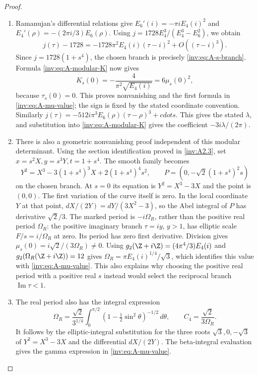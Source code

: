 \begin{proof}
\begin{enumerate}[label={$\langle1\rangle$\arabic*.},leftmargin=*]
\item Ramanujan's differential relations give
$E_6'(i)=-\pi i E_4(i)^2$ and
$E_4'(\rho)=-(2\pi i/3)E_6(\rho)$.
Using $j=1728E_4^3/(E_4^3-E_6^2)$, we obtain
\[
j(\tau)-1728=-1728\pi^2E_4(i)(\tau-i)^2+O((\tau-i)^3).
\]
Since $j=1728(1+s^4)$, the chosen branch is precisely
\eqref{inv:eq:A-s-branch}.  Formula \eqref{inv:eq:A-modular-K} now gives
\[
K_s(0)=-\frac4{\pi^2\sqrt{E_4(i)}}=6\mu_s(0)^2,
\]
because $\tau_s(0)=0$.  This proves nonvanishing and the first
formula in \eqref{inv:eq:A-mu-value}; the sign is fixed by the stated
coordinate convention.  Similarly
$j(\tau)=-512i\pi^3E_6(\rho)(\tau-\rho)^3+cdots$.
This gives the stated $\lambda$, and substitution into
\eqref{inv:eq:A-modular-K} gives the coefficient $-3i\lambda/(2\pi)$.

\item There is also a geometric nonvanishing proof independent of this
modular determinant.  Using the section identification proved in
\ref{inv:A2.3}, set $x=s^2X,y=s^3Y,t=1+s^4$.  The smooth family becomes
\[
Y^2=X^3-3(1+s^4)^3X+2(1+s^4)^4s^2,
\qquad P=(0,-\sqrt2(1+s^4)^2s)
\]
on the chosen branch.  At $s=0$ its equation is
$Y^2=X^3-3X$ and the point is $(0,0)$.  The first variation of the
curve itself is zero.  In the local coordinate $Y$ at that point,
$dX/(2Y)=dY/(3X^2-3)$, so the Abel integral of $P$ has derivative
$\sqrt2/3$.  The marked period is $-i\Omega_R$, rather than the
positive real period $\Omega_R$: the positive imaginary branch
$\tau=iy$, $y>1$, has elliptic scale $F/s=i/\Omega_R$ at zero.
Its period has zero first derivative.  Division gives
$\mu_s(0)=i\sqrt2/(3\Omega_R)\ne0$.
Using $g_2(\Z+i\Z)=(4\pi^4/3)E_4(i)$ and
$g_2(\Omega_R(\Z+i\Z))=12$ gives
$\Omega_R=\pi E_4(i)^{1/4}/\sqrt3$, which identifies this value
with \eqref{inv:eq:A-mu-value}.  This also explains why choosing the
positive real period with a positive real $s$ instead would select
the reciprocal branch $\operatorname{Im}\tau<1$.

\item The real period also has the integral expression
\[
\Omega_R=\frac{\sqrt2}{3^{1/4}}
\int_0^{\pi/2}(1-\tfrac12\sin^2\theta)^{-1/2}\,d\theta,
\qquad C_4=\frac{\sqrt2}{3\Omega_R}.
\]
It follows by the elliptic-integral substitution for the three roots
$\sqrt3,0,-\sqrt3$ of $Y^2=X^3-3X$ and the differential
$dX/(2Y)$. The beta-integral evaluation gives the gamma expression
in \eqref{inv:eq:A-mu-value}.


\end{enumerate}
\end{proof}
